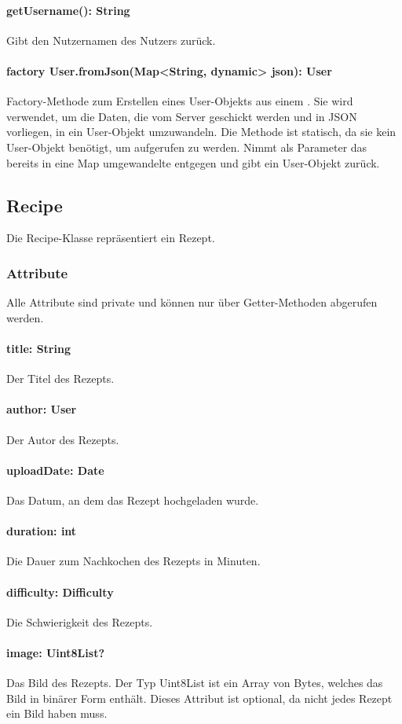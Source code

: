 \documentclass[parskip=full]{scrartcl}
\begin{document}
\paragraph{getUsername(): String}
Gibt den Nutzernamen des Nutzers zurück.
\paragraph{factory User.fromJson(Map<String, dynamic> json): User} Factory-Methode zum Erstellen eines User-Objekts aus einem . Sie wird verwendet, um die Daten, die vom Server geschickt werden und in \Gls{JSON} vorliegen, in ein User-Objekt umzuwandeln. Die Methode ist statisch, da sie kein User-Objekt benötigt, um aufgerufen zu werden. Nimmt als Parameter das bereits in eine Map umgewandelte  entgegen und gibt ein User-Objekt zurück.

\subsection{Recipe}
Die Recipe-Klasse repräsentiert ein Rezept.
\subsubsection{Attribute}
Alle Attribute sind private und können nur über Getter-Methoden abgerufen werden.
\paragraph{title: String}
Der Titel des Rezepts.
\paragraph{author: User}
Der Autor des Rezepts.
\paragraph{uploadDate: Date}
Das Datum, an dem das Rezept hochgeladen wurde.
\paragraph{duration: int}
Die Dauer zum Nachkochen des Rezepts in Minuten.
\paragraph{difficulty: Difficulty}
Die Schwierigkeit des Rezepts.
\paragraph{image: Uint8List?}
Das Bild des Rezepts. Der Typ Uint8List ist ein Array von Bytes, welches das Bild in binärer Form enthält. Dieses Attribut ist optional, da nicht jedes Rezept ein Bild haben muss.
\end{document}
